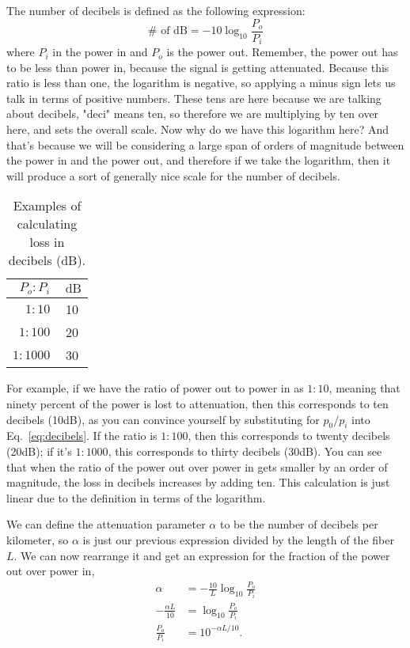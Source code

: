 The number of decibels is defined as the following expression:
\begin{equation}
\# \text { of } \mathrm{dB}=-10 \log _{10} \frac{P_o}{P_i}
\label{eq:decibels}
\end{equation}
where $P_i$ in the power in and $P_o$ is the power out. Remember, the power out has to be less than power in, because the signal is getting attenuated.  Because this ratio is less than one, the logarithm is negative, so applying a minus sign lets us talk in terms of positive numbers. These tens are here because we are talking about decibels, "deci" means ten, so therefore we are multiplying by ten over here, and sets the overall scale. Now why do we have this logarithm here? And that's because we will be considering a large span of orders of magnitude between the power in and the power out, and therefore if we take the logarithm, then it will produce a sort of generally nice scale for the number of decibels.
\begin{table}
\centering
\begin{tabular}{r|c}
$P_o: P_i$ & $\mathrm{~dB}$ \\
\hline $1: 10$ & 10 \\
$1: 100$ & 20 \\
$1: 1000$ & 30
\end{tabular}
\caption{Examples of calculating loss in decibels (dB).}
\label{tab:decibels}
\end{table}

For example, if we have the ratio of power out to power in as $1:10$, meaning that ninety percent of the power is lost to attenuation, then this corresponds to ten decibels (10dB), as you can convince yourself by substituting for $p_0/p_i$ into Eq.~\ref{eq:decibels}. If the ratio is $1:100$, then this corresponds to twenty decibels (20dB); if it's $1:1000$, this corresponds to thirty decibels (30dB). You can see that when the ratio of the power out over power in gets smaller by an order of magnitude, the loss in decibels increases by adding ten. This calculation is just linear due to the definition in terms of the logarithm.

We can define the attenuation parameter $\alpha$ to be the number of decibels per kilometer, so $\alpha$ is just our previous expression divided by the length of the fiber $L$. We can now rearrange it and get an expression for the fraction of the power out over power in,
\begin{equation}
\begin{aligned}
\alpha & =-\frac{10}{L} \log _{10} \frac{P_o}{P_i} \\
-\frac{\alpha L}{10} & =\log _{10} \frac{P_o}{P_i} \\
\frac{P_o}{P_i} & =10^{-\alpha L / 10}.
\end{aligned}
\end{equation}

